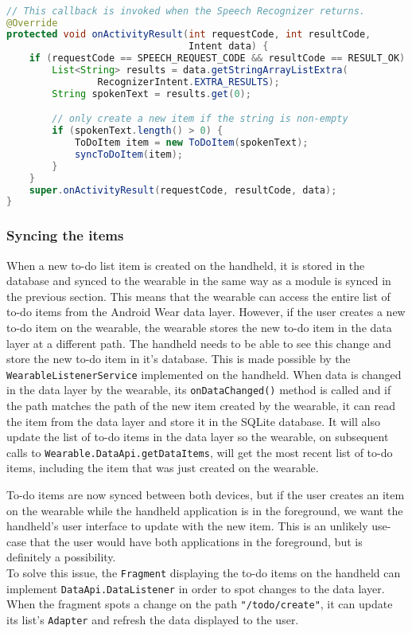 \begin{lstlisting}[language=Java]

// This callback is invoked when the Speech Recognizer returns.
@Override
protected void onActivityResult(int requestCode, int resultCode,
                                Intent data) {
    if (requestCode == SPEECH_REQUEST_CODE && resultCode == RESULT_OK) {
        List<String> results = data.getStringArrayListExtra(
                RecognizerIntent.EXTRA_RESULTS);
        String spokenText = results.get(0);

        // only create a new item if the string is non-empty
        if (spokenText.length() > 0) {
            ToDoItem item = new ToDoItem(spokenText);
            syncToDoItem(item);
        }
    }
    super.onActivityResult(requestCode, resultCode, data);
}

\end{lstlisting}

\subsubsection{Syncing the items}

When a new to-do list item is created on the handheld, it is stored in the
database and synced to the wearable in the same way as a module is synced in
the previous section. This means that the wearable can access the entire list
of to-do items from the Android Wear data layer. However, if the user creates
a new to-do item on the wearable, the wearable stores the new to-do item in the
data layer at a different path. The handheld needs to be able to see this change
and store the new to-do item in it's database. This is made possible by the
\texttt{WearableListenerService} implemented on the handheld. When data is
changed in the data layer by the wearable, its \texttt{onDataChanged()} method
is called and if the path matches the path of the new item created by the
wearable, it can read the item from the data layer and store it in the SQLite
database. It will also update the list of to-do items in the data layer so the
wearable, on subsequent calls to \texttt{Wearable.DataApi.getDataItems}, will
get the most recent list of to-do items, including the item that was just
created on the wearable.

To-do items are now synced between both devices, but if the user creates an
item on the wearable while the handheld application is in the foreground, we
want the handheld's user interface to update with the new item. This is an
unlikely use-case that the user would have both applications in the foreground,
but is definitely a possibility.\\
To solve this issue, the \texttt{Fragment} displaying the to-do items on the
handheld can implement \texttt{DataApi.DataListener} in order to spot changes
to the data layer. When the fragment spots a change on the path 
\texttt{"/todo/create"}, it can update its list's \texttt{Adapter} and refresh
the data displayed to the user.

